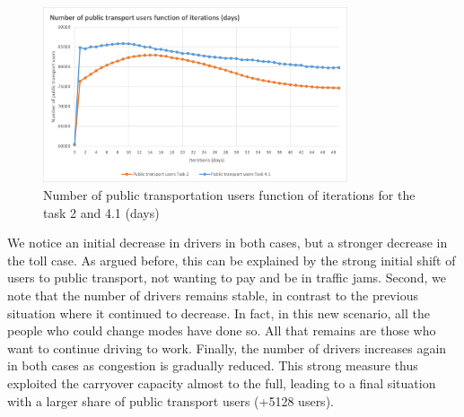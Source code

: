 \documentclass[a4paper, 12pt,oneside]{article}
\begin{document}
\begin{figure}[H]
    \centering
    \includegraphics[width=0.8\textwidth]{Images/Step4/number_TP_users_function_iterations_comparaison_task2_4.1.png}
    \caption{Number of public transportation users function of iterations for the task 2 and 4.1 (days)}
    \label{fig:Number of public transportation users function of iterations for the task 2 and 4.1 (days)}
\end{figure}

We notice an initial decrease in drivers in both cases, but a stronger decrease in the toll case. As argued before, this can be explained by the strong initial shift of users to public transport, not wanting to pay and be in traffic jams. Second, we note that the number of drivers remains stable, in contrast to the previous situation where it continued to decrease. In fact, in this new scenario, all the people who could change modes have done so. All that remains are those who want to continue driving to work. Finally, the number of drivers increases again in both cases as congestion is gradually reduced. This strong measure thus exploited the carryover capacity almost to the full, leading to a final situation with a larger share of public transport users (+5128 users).\\











\end{document}
